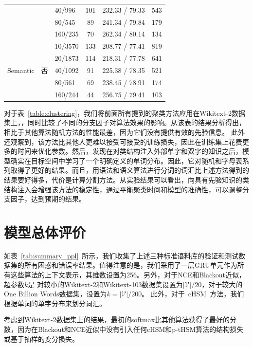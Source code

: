 \begin{table}[!ht]
\begin{tabular}{lclccc}
    &&40/996 &101&232.33 / 79.33&543\\
    &&80/545 &89&241.34 / 79.84&179\\
    &&160/235 &70&262.34 / 80.14&134\\
  \midrule
  \multirow{5}{*}{Semantic}  &\multirow{5}{*}{否} &10/3570 &133&208.77 / 77.41&819\\
    & &20/1873 &114&218.31 / 77.78&641\\
    & &40/1092 &91&225.38 / 78.35&521\\
    & &80/561 &69&238.45 / 78.91&174\\
    & &160/244 &44&256.75 / 79.41&103\\
\bottomrule
  \end{tabular}
\end{table}

对于表~\ref{table:clustering}，我们将前面所有提到的聚类方法应用在Wikitext-2数据集上，，同时比较了不同的分支因子对算法效果的影响。从该表的结果分析得出，相比于其他算法随机方法的性能最差，因为它们没有提供有效的先验信息。
此外还观察到，该方法比其他人更难以接受可接受的训练损失，因此在训练集上花费更多的时间来优化参数。然后，发现在对类结构注入外部单字和双字的知识之后，模型确实在目标空间中学习了一个明确定义的单词分布。因此，它对随机和字母表系列取得了更好的结果。而且，用语法和语义算法进行分词的词汇比上述方法得到的结果要好得多，代价是计算分割方法。从实验结果可以看出，向具有先验知识的类结构注入会增强该方法的稳定性，通过平衡聚类时间和模型的准确性，可以调整分支因子，达到预期的结果。



\section{模型总体评价}
如表~\ref{tab:summary_ppl}~所示，我们收集了上述三种标准语料库的验证和测试数据集的所有困惑和错误率结果。值得注意的是，我们采用了一层GRU单元作为所有这些算法的上下文表示，其维数设置为256。另外，对于NCE和Blackout近似，超参数$ k $是 对较小的Wikitext-2和Wikitext-103数据集设置为$\mathcal{|V|}/20 $，对于较大的One Billion Words数据集，设置为$ k=|\mathcal{V}|/200 $。 此外，对于~cHSM~方法，我们根据单词的单字分布来划分词汇。

考虑到Wikitext-2数据集上的结果，最初的softmax比其他算法获得了最好的分数，因为在Blackout和NCE近似中没有引入任何cHSM和p-tHSM算法的结构损失或基于抽样的变分损失。

